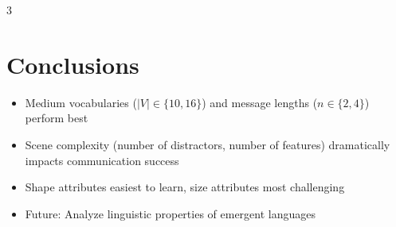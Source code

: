 \documentclass[a0,36pt,plainsections]{sciposter}
\newcommand{\sectiontitle}[1]{\textcolor{highlightblue}{\textbf{\Large #1}}}
\begin{document}
\begin{multicols}{3}

  \section*{\sectiontitle{Conclusions}}
  \begin{itemize}
    \item Medium vocabularies ($|V| \in \{10,16\}$) and message lengths ($n \in \{2,4\}$) perform best
    \item Scene complexity (number of distractors, number of features) dramatically impacts communication success
    \item Shape attributes easiest to learn, size attributes most challenging
    \item Future: Analyze linguistic properties of emergent languages
  \end{itemize}

\end{multicols}

\vfill
\end{document}
